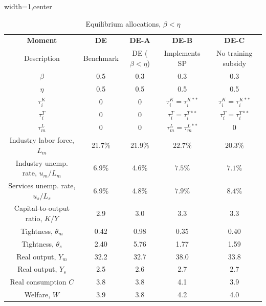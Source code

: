 \documentclass[12pt]{article} %
\theoremstyle{definition}
\begin{document}
\begin{table}[h!]
 \caption{Equilibrium allocations, $\beta<\eta$} \label{policytable_small_beta}
\centering
\begin{adjustbox}{width=1\columnwidth,center}
 \begin{tabular}{||c c c c c||} 
 \hline
 \textbf{Moment} &  \textbf{DE} & \textbf{DE-A}  & \textbf{DE-B }  & \textbf{DE-C}\\  
 Description  & Benchmark  & DE ($\beta<\eta$) & Implements SP  &  No training subsidy \\
$\beta$   & 0.5 & 0.3  & 0.3  &  0.3 \\
$\eta$   & 0.5 & 0.5  & 0.5  &  0.5 \\
  $\tau^K_i$ & 0 &    0    &  $\tau^K_i=\tau^{K**}_i$    &  $\tau^K_i = \tau^{K**}_i$  \\
    $\tau^T_i$ & 0 &  0    &  $\tau^T_i=\tau^{T**}_i$   &   $\tau^T_i=\tau^{T**}_i$  \\ 
        $\tau^L_m$ & 0 &  0    &  $\tau^L_m=\tau^{L**}_m$    &   0  \\ 
 \hline\hline
  Industry labor force, $L_m$ & 21.7\%& 21.9\%& $22.7\%$&   $20.3\%$\\
  Industry unemp. rate, $u_m/L_m$ & 6.9\%& 4.6\%& $7.5\%$&  $7.1\%$\\ 
   Services unemp. rate, $u_s/L_s$ & 6.9\%& 4.8\%&   $7.9\%$&   $8.4\%$\\ 
  Capital-to-output ratio, $K/Y$ & 2.9& 3.0    & 3.3&  3.3\\
  Tightness, $\theta_m$ & 0.42& 0.98&  0.35&  0.40\\
    Tightness, $\theta_s$ & 2.40& 5.76&  1.77&  1.59\\
 Real output, $Y_m$ & 32.2& 32.7& 38.0& 33.8\\
Real output, $Y_s$ & 2.5 & 2.6  &  2.7 &  2.7 \\
 Real consumption $C$   & 3.8& 3.8& 4.1& 3.9\\  
 Welfare, $W$  &   3.9& 3.8&  4.2&  4.0\\
 \hline
 \end{tabular}

 \end{adjustbox}
\end{table} 
\end{document}
